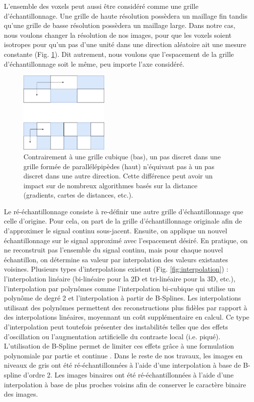 L'ensemble des voxels peut aussi être considéré comme une grille d'échantillonnage. Une grille de haute résolution possèdera un maillage fin tandis qu'une grille de basse résolution possèdera un maillage large. Dans notre cas, nous voulons changer la résolution de nos images, pour que les voxels soient isotropes pour qu'un pas d'une unité dans une direction aléatoire ait une mesure constante (Fig. \ref{fig:resolution_voxels_shapes}). Dit autrement, nous voulons que l'espacement de la grille d'échantillonnage soit le même, peu importe l'axe considéré.
\begin{figure}[!ht]
  \centering
  \includegraphics[height=4cm]{Images/resolution_voxels_shape.png}
  \caption{Contrairement à une grille cubique (bas), un pas discret dans une grille formée de parallélépipèdes (haut) n'équivaut pas à un pas discret dans une autre direction. Cette différence peut avoir un impact sur de nombreux algorithmes basés sur la distance (gradients, cartes de distances, etc.).}
  \label{fig:resolution_voxels_shapes}
\end{figure}
Le ré-échantillonnage consiste à re-définir une autre grille d'échantillonnage que celle d'origine. Pour cela, on part de la grille d'échantillonnage originale afin de d'approximer le signal continu sous-jacent. Ensuite, on applique un nouvel échantillonnage sur le signal approximé avec l'espacement désiré. En pratique, on ne reconstruit pas l'ensemble du signal continu, mais pour chaque nouvel échantillon, on détermine sa valeur par interpolation des valeurs existantes voisines. Plusieurs types d'interpolations existent (Fig. \ref{fig:interpolation}) : l'interpolation linéaire (bi-linéaire pour la 2D et tri-linéaire pour la 3D, etc.), l'interpolation par polynômes comme l'interpolation bi-cubique qui utilise un polynôme de degré 2 et l'interpolation à partir de B-Splines. Les interpolations utilisant des polynômes permettent des reconstructions plus fidèles par rapport à des interpolations linéaires, moyennant un coût supplémentaire en calcul. Ce type d'interpolation peut toutefois présenter des instabilités telles que des effets d'oscillation ou l'augmentation artificielle du contraste local (i.e. piqué). L'utilisation de B-Spline permet de limiter ces effets grâce à une formulation polynomiale par partie et continue \cite{Unser1993_bspline}. Dans le reste de nos travaux, les images en niveaux de gris ont été ré-échantillonnées à l'aide d'une interpolation à base de B-spline d'ordre 2. Les images binaires ont été ré-échantillonnées à l'aide d'une interpolation à base de plus proches voisins afin de conserver le caractère binaire des images.
